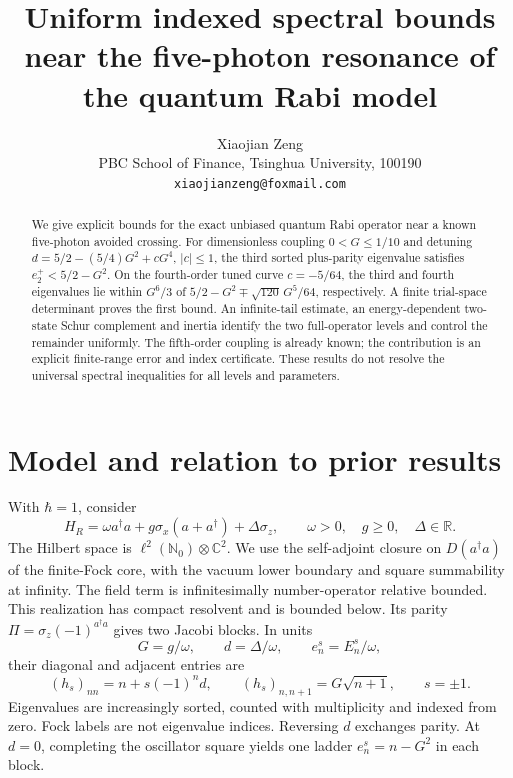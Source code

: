 \documentclass[11pt]{article}
\title{Uniform indexed spectral bounds near the five-photon resonance of the quantum Rabi model}
\author{Xiaojian Zeng\\
\small PBC School of Finance, Tsinghua University, 100190\\
\small \texttt{xiaojianzeng@foxmail.com}}
\date{}
\newcommand{\R}{\mathbb R}
\newcommand{\N}{\mathbb N}
\begin{document}
\maketitle
\begin{abstract}
We give explicit bounds for the exact unbiased quantum Rabi operator near a known five-photon avoided crossing. For dimensionless coupling $0<G\leq 1/10$ and detuning
$d=5/2-(5/4)G^2+cG^4$, $|c|\leq1$, the third sorted plus-parity eigenvalue satisfies $e_2^+<5/2-G^2$. On the fourth-order tuned curve $c=-5/64$, the third and fourth eigenvalues lie within $G^6/3$ of $5/2-G^2\mp\sqrt{120}\,G^5/64$, respectively. A finite trial-space determinant proves the first bound. An infinite-tail estimate, an energy-dependent two-state Schur complement and inertia identify the two full-operator levels and control the remainder uniformly. The fifth-order coupling is already known; the contribution is an explicit finite-range error and index certificate. These results do not resolve the universal spectral inequalities for all levels and parameters.
\end{abstract}

\section{Model and relation to prior results}
With $\hbar=1$, consider
\begin{equation}\label{eq:HR}
H_R=\omega a^\dagger a+g\sigma_x(a+a^\dagger)+\Delta\sigma_z,
\qquad \omega>0,\quad g\geq0,\quad\Delta\in\R .
\end{equation}
The Hilbert space is $\ell^2(\N_0)\otimes\mathbb C^2$. We use the self-adjoint closure on $D(a^\dagger a)$ of the finite-Fock core, with the vacuum lower boundary and square summability at infinity. The field term is infinitesimally number-operator relative bounded. This realization has compact resolvent and is bounded below. Its parity $\Pi=\sigma_z(-1)^{a^\dagger a}$ gives two Jacobi blocks. In units
\[
G=g/\omega,\qquad d=\Delta/\omega,\qquad e_n^s=E_n^s/\omega,
\]
their diagonal and adjacent entries are
\begin{equation}\label{eq:jacobi}
(h_s)_{nn}=n+s(-1)^n d,\qquad
(h_s)_{n,n+1}=G\sqrt{n+1},\qquad s=\pm1 .
\end{equation}
Eigenvalues are increasingly sorted, counted with multiplicity and indexed from zero. Fock labels are not eigenvalue indices. Reversing $d$ exchanges parity. At $d=0$, completing the oscillator square yields one ladder $e_n^s=n-G^2$ in each block.
\end{document}
